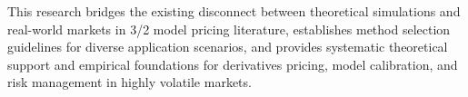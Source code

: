 \begin{eabstract}
    This research bridges the existing disconnect between theoretical simulations and real-world markets in 3/2 model pricing literature, establishes method selection guidelines for diverse application scenarios, and provides systematic theoretical support and empirical foundations for derivatives pricing, model calibration, and risk management in highly volatile markets.
\end{eabstract}

